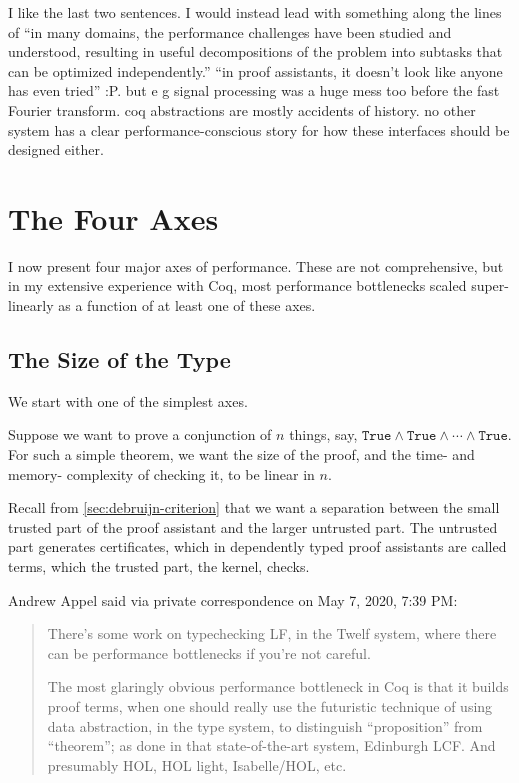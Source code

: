 I like the last two sentences.
I would instead lead with something along the lines of ``in many domains, the performance challenges have been studied and understood, resulting in useful decompositions of the problem into subtasks that can be optimized independently.''
``in proof assistants, it doesn't look like anyone has even tried'' :P.
but e g signal processing was a huge mess too before the fast Fourier transform.
coq abstractions are mostly accidents of history.
no other system has a clear performance-conscious story for how these interfaces should be designed either.

\section{The Four Axes}\label{sec:perf-axes}
I now present four major axes of performance.
These are not comprehensive, but in my extensive experience with Coq, most performance bottlenecks scaled super-linearly as a function of at least one of these axes.

\subsection{The Size of the Type} \label{sec:perf-axis:size-of-type}  \label{sec:quadratic-conj-certificate}

We start with one of the simplest axes.

Suppose we want to prove a conjunction of $n$ things, say, $\texttt{True} \wedge \texttt{True} \wedge \cdots \wedge \texttt{True}$.
For such a simple theorem, we want the size of the proof, and the time- and memory- complexity of checking it, to be linear in $n$.

Recall from \autoref{sec:debruijn-criterion} that we want a separation between the small trusted part of the proof assistant and the larger untrusted part.
The untrusted part generates certificates, which in dependently typed proof assistants are called terms, which the trusted part, the kernel, checks.

\begin{minorcomment}
Andrew Appel said via private correspondence on May 7, 2020, 7:39 PM:
\begin{quotation}
There's some work on typechecking LF, in the Twelf system, where there can be performance bottlenecks if you're not careful.

The most glaringly obvious performance bottleneck in Coq is that it builds proof terms, when one should really use the futuristic technique of using data abstraction, in the type system, to distinguish ``proposition'' from ``theorem''; as done in that state-of-the-art system, Edinburgh LCF.  And presumably HOL, HOL light, Isabelle/HOL, etc.
\end{quotation}
\end{minorcomment}

